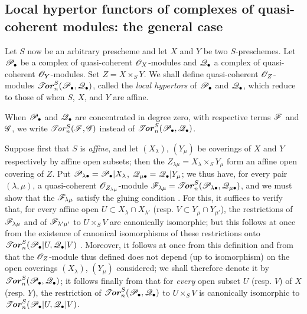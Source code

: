 \subsection{Local hypertor functors of complexes of quasi-coherent modules: the general case}
\label{subsection:III.6.5}

\begin{env}[6.5.1]
\label{III.6.5.1}
Let $S$ now be an arbitrary prescheme and let $X$ and $Y$ be two
$S$-preschemes.  Let $\mathscr{P}_\bullet$ be a complex of quasi-coherent
$\mathscr{O}_X$-modules and $\mathscr{Q}_\bullet$ a complex of quasi-coherent
$\mathscr{O}_Y$-modules.  Set $Z=X\times_SY$.  We shall define
quasi-coherent $\mathscr{O}_Z$-modules $\boldsymbol{\mathscr{T}\!\mathit{or}}_n^S(\mathscr{P}_\bullet,\mathscr{Q}_\bullet)$,
called the \emph{local hypertors} of $\mathscr{P}_\bullet$ and
$\mathscr{Q}_\bullet$, which reduce to those of  when
$S$, $X$, and $Y$ are affine.

When $\mathscr{P}_\bullet$ and $\mathscr{Q}_\bullet$ are concentrated in
degree zero, with respective terms $\mathscr{F}$ and $\mathscr{G}$, we write
$\mathscr{T}\!\mathit{or}_n^S(\mathscr{F},\mathscr{G})$ instead of
$\boldsymbol{\mathscr{T}\!\mathit{or}}_n^S(\mathscr{P}_\bullet,\mathscr{Q}_\bullet)$.
\end{env}

\begin{env}[6.5.2]
\label{III.6.5.2}
Suppose first that $S$ is \emph{affine}, and let $(X_\lambda)$,
$(Y_\mu)$ be coverings of $X$ and $Y$ respectively by affine open subsets;
then the $Z_{\lambda\mu}=X_\lambda\times_SY_\mu$
form an affine open covering of $Z$.  Put
$\mathscr{P}_{\lambda\bullet}=\mathscr{P}_\bullet|X_\lambda$,
$\mathscr{Q}_{\mu\bullet}=\mathscr{Q}_\bullet|Y_\mu$; we thus have, for every
pair $(\lambda,\mu)$, a quasi-coherent
$\mathscr{O}_{Z_{\lambda\mu}}$-module $\mathscr{F}_{\lambda\mu}
=
\boldsymbol{\mathscr{T}\!\mathit{or}}_n^S(\mathscr{P}_{\lambda\bullet},\mathscr{Q}_{\mu\bullet})$,
and we must show that the $\mathscr{F}_{\lambda\mu}$ satisfy the gluing
condition .  For this, it suffices to verify that, for
every affine open $U\subset X_\lambda\cap X_{\lambda'}$ (resp.
$V\subset Y_\mu\cap Y_{\mu'}$),
the restrictions of $\mathscr{F}_{\lambda\mu}$ and of
$\mathscr{F}_{\lambda'\mu'}$ to $U\times_SV$ are canonically
isomorphic; but this follows at once from the existence of canonical
isomorphisms of these restrictions onto
$\boldsymbol{\mathscr{T}\!\mathit{or}}_n^S(\mathscr{P}_\bullet|U,\mathscr{Q}_\bullet|V)$
.  Moreover, it follows at once from this definition and
from  that the $\mathscr{O}_Z$-module thus defined does not
depend (up to isomorphism) on the open coverings $(X_\lambda)$,
$(Y_\mu)$ considered; we shall therefore denote it by
 $\boldsymbol{\mathscr{T}\!\mathit{or}}_n^S(\mathscr{P}_\bullet,\mathscr{Q}_\bullet)$;
it follows finally from  that for \emph{every} open subset
$U$ (resp. $V$) of $X$ (resp. $Y$), the restriction of
$\boldsymbol{\mathscr{T}\!\mathit{or}}_n^S(\mathscr{P}_\bullet,\mathscr{Q}_\bullet)$ to $U\times_SV$ is canonically
isomorphic to $\boldsymbol{\mathscr{T}\!\mathit{or}}_n^S(\mathscr{P}_\bullet|U,\mathscr{Q}_\bullet|V)$.
\end{env}

